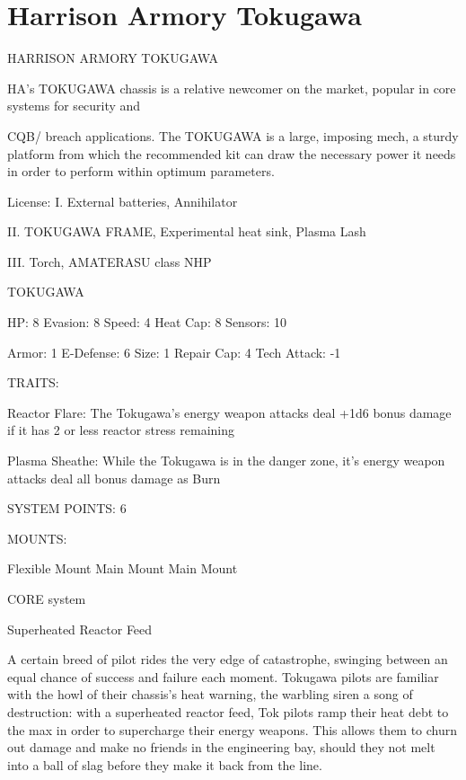 \section{Harrison Armory Tokugawa}

                             HARRISON ARMORY TOKUGAWA

HA’s TOKUGAWA chassis is a relative newcomer on the market, popular in core systems for security and

CQB/ breach applications. The TOKUGAWA is a large, imposing mech, a sturdy platform from which the
recommended kit can draw the necessary power it needs in order to perform within optimum parameters.

                                                  License:
I. External batteries, Annihilator

II. TOKUGAWA FRAME, Experimental heat sink, Plasma Lash

III. Torch, AMATERASU class NHP





                                                    TOKUGAWA

  HP: 8            Evasion: 8                              Speed: 4             Heat Cap: 8         Sensors: 10

  Armor: 1         E-Defense: 6                            Size: 1              Repair Cap: 4       Tech Attack: -1

                                                        TRAITS:

  Reactor Flare: The Tokugawa’s energy weapon attacks deal +1d6 bonus damage if it has 2 or less
  reactor stress remaining

  Plasma Sheathe: While the Tokugawa is in the danger zone, it’s energy weapon attacks deal all bonus
  damage as Burn

                                                 SYSTEM POINTS: 6

                                                       MOUNTS:

  Flexible Mount                       Main Mount                               Main Mount

                                                    CORE system

                                             Superheated Reactor Feed

  A certain breed of pilot rides the very edge of catastrophe, swinging between an equal chance of
  success and failure each moment. Tokugawa pilots are familiar with the howl of their chassis’s heat
  warning, the warbling siren a song of destruction: with a superheated reactor feed, Tok pilots ramp their
  heat debt to the max in order to supercharge their energy weapons. This allows them to churn out
  damage and make no friends in the engineering bay, should they not melt into a ball of slag before they
  make it back from the line.

